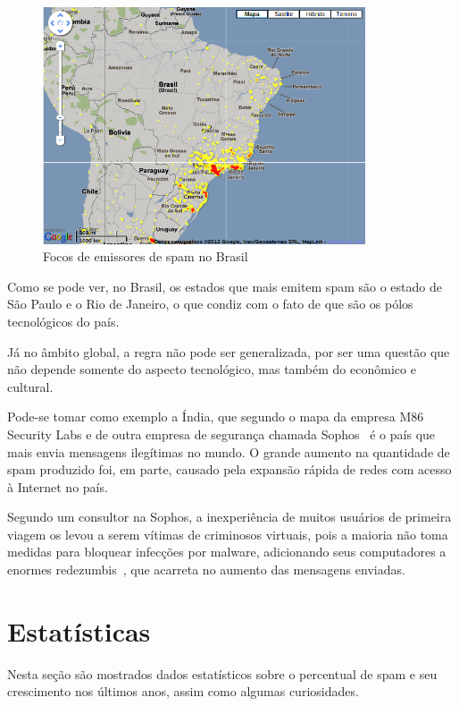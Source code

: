 \documentclass[a4paper,dvipdfm]{article}
\begin{document}
	\begin{figure}
		\centering
		\includegraphics[height=7cm]{Imagens/spam/brasilspam.png}
		\caption{Focos de emissores de spam no Brasil}
		\label{fig:spambrasil}
	\end{figure}
	
	Como se pode ver, no Brasil, os estados que mais emitem spam são o estado de São Paulo e o Rio de Janeiro, o que condiz com o fato de que são os pólos tecnológicos do país.

	Já no âmbito global, a regra não pode ser generalizada, por ser uma questão que não depende somente do aspecto tecnológico, mas também do econômico e cultural.

	Pode-se tomar como exemplo a Índia, que segundo o mapa da empresa M86 Security Labs e de outra empresa de segurança chamada Sophos~\cite{sophos} é o país que mais envia mensagens ilegítimas no mundo.
	O grande aumento na quantidade de spam produzido foi, em parte, causado pela expansão rápida de redes com acesso à Internet no país.

	Segundo um consultor na Sophos, a inexperiência de muitos usuários de primeira viagem os levou a serem vítimas de criminosos virtuais, pois a maioria não toma medidas para bloquear infecções por \gls{malware}, adicionando seus computadores a enormes \glspl{redezumbi}~\cite{spam:india}, que acarreta no aumento das mensagens enviadas. 

\newpage
\section {Estatísticas}
	Nesta seção são mostrados dados estatísticos sobre o percentual de spam e seu crescimento nos últimos anos, assim como algumas curiosidades.
	
\end{document}
